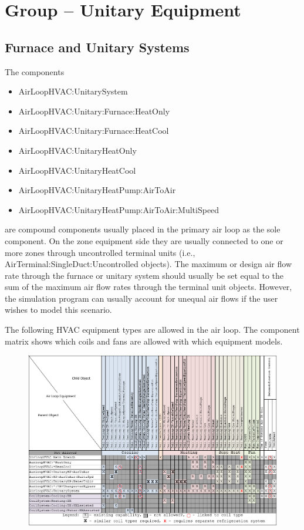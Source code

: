 \section{Group -- Unitary Equipment}\label{group-unitary-equipment}

\subsection{Furnace and Unitary Systems}\label{furnace-and-unitary-systems}

The components

\begin{itemize}
\item
  AirLoopHVAC:UnitarySystem
\item
  AirLoopHVAC:Unitary:Furnace:HeatOnly
\item
  AirLoopHVAC:Unitary:Furnace:HeatCool
\item
  AirLoopHVAC:UnitaryHeatOnly
\item
  AirLoopHVAC:UnitaryHeatCool
\item
  AirLoopHVAC:UnitaryHeatPump:AirToAir
\item
  AirLoopHVAC:UnitaryHeatPump:AirToAir:MultiSpeed
\end{itemize}

are compound components usually placed in the primary air loop as the sole component. On the zone equipment side they are usually connected to one or more zones through uncontrolled terminal units (i.e., AirTerminal:SingleDuct:Uncontrolled objects). The maximum or design air flow rate through the furnace or unitary system should usually be set equal to the sum of the maximum air flow rates through the terminal unit objects. However, the simulation program can usually account for unequal air flows if the user wishes to model this scenario.

The following HVAC equipment types are allowed in the air loop. The component matrix shows which coils and fans are allowed with which equipment models.

\begin{figure}[htbp]
\centering
\includegraphics{media/AirLoopComponentMatrix.png}
\caption{}
\end{figure}

